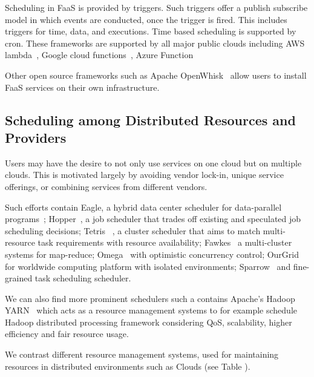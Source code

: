 \documentclass[final,5p,times,twocolumn]{elsarticle}
\begin{document}
Scheduling in FaaS is provided by triggers. Such triggers offer a
publish subscribe model in which events are conducted, once the
trigger is fired. This includes triggers for time, data, and
executions. Time based scheduling is supported by cron.  These
frameworks are supported by all major public clouds including AWS
lambda~\cite{AWSlambda2018}, Google cloud
functions~\cite{GoogleCF2018}, Azure Function~\cite{Azure2018}

Other open source frameworks such as Apache
OpenWhisk~\cite{OpenWhisk2018} allow users to install FaaS services on
their own infrastructure.


\subsection{Scheduling among Distributed Resources and Providers}
\label{sec:distributed}





Users may have the desire to not only use services on one cloud but on
multiple clouds. This is motivated largely by avoiding vendor lock-in,
unique service offerings, or combining services from different
vendors.



Such efforts contain Eagle, a hybrid data center scheduler for
data-parallel programs~\cite{delgado2016job};
Hopper~\cite{ren2015hopper}, a job scheduler that trades off existing
and speculated job scheduling decisions; Tetris
~\cite{grandl2015multi}, a cluster scheduler that aims to match
multi-resource task requirements with resource availability;
Fawkes~\cite{ghit2014balanced} a multi-cluster systems for map-reduce;
Omega~\cite{schwarzkopf2013omega} with optimistic concurrency control;
OurGrid~\cite{andrade2003ourgrid,cirne2006labs} for worldwide
computing platform with isolated environments;
Sparrow~\cite{ousterhout2013sparrow} and fine-grained task scheduling
scheduler.
  
We can also find more prominent schedulers such a contains Apache's
  Hadoop YARN~\cite{vavilapalli2013apache} which acts as a resource
  management systems to for example schedule Hadoop distributed
  processing framework considering QoS, scalability, higher efficiency
  and fair resource usage.

We contrast different resource management systems, used for
maintaining resources in distributed environments such as Clouds (see
Table \label{T:distr-cloud}).
\end{document}

